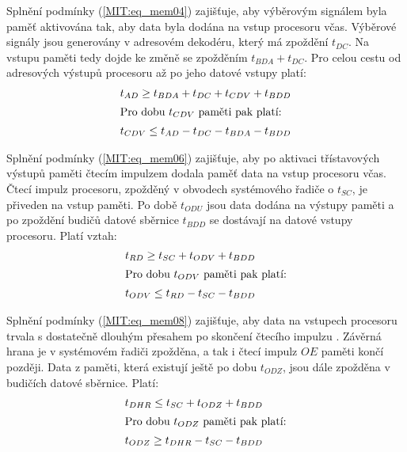         Splnění podmínky (\ref{MIT:eq_mem04}) zajišťuje, aby výběrovým signálem 
         byla paměť aktivována tak, aby data byla dodána na vstup 
        procesoru včas. Výběrové signály jsou generovány v adresovém dekodéru, který má zpoždění 
        \(t_{DC}\). Na vstupu  paměti tedy dojde ke změně se zpožděním 
        \(t_{BDA} + t_{DC}\). Pro celou cestu od adresových výstupů procesoru až po jeho datové 
        vstupy platí:
        \begin{align}
          t_{AD} \geq t_{BDA} + t_{DC} + t_{CDV} + t_{BDD} \label{MIT:eq_mem03}    \\
          \shortintertext{Pro dobu \(t_{CDV}\) paměti pak platí:}
          t_{CDV} \leq t_{AD} - t_{DC} - t_{BDA} - t_{BDD} \label{MIT:eq_mem04}
        \end{align}
        
        Splnění podmínky (\ref{MIT:eq_mem06}) zajišťuje, aby po aktivaci třístavových výstupů 
        paměti čtecím impulzem  dodala paměť data na vstup procesoru 
        včas. Čtecí impulz procesoru, zpožděný v obvodech systémového řadiče o \(t_{SC}\), je 
        přiveden na vstup  paměti. Po době \(t_{ODU}\) jsou data dodána 
        na výstupy paměti a po zpoždění budičů datové sběrnice \(t_{BDD}\) se dostávají na datové 
        vstupy procesoru. Platí vztah:
        \begin{align}
          t_{RD} \geq t_{SC} + t_{ODV} + t_{BDD} \label{MIT:eq_mem05}  \\
          \shortintertext{Pro dobu \(t_{ODV}\) paměti pak platí:}
          t_{ODV} \leq t_{RD} - t_{SC} - t_{BDD}  \label{MIT:eq_mem06}
        \end{align}

        Splnění podmínky (\ref{MIT:eq_mem08}) zajišťuje, aby data na vstupech procesoru trvala s 
        dostatečně dlouhým přesahem po skončení čtecího impulzu  . 
        Závěrná hrana  je v systémovém řadiči zpožděna, a tak i čtecí 
        impulz \(OE\) paměti končí později. Data z paměti, která existují ještě po dobu 
        \(t_{ODZ}\), jsou dále zpožděna v budičích datové sběrnice. Platí:
        \begin{align}
          t_{DHR} \leq t_{SC} + t_{ODZ} + t_{BDD} \label{MIT:eq_mem07}  \\
          \shortintertext{Pro dobu \(t_{ODZ}\) paměti pak platí:}
          t_{ODZ} \geq t_{DHR} - t_{SC} - t_{BDD} \label{MIT:eq_mem08}
        \end{align}


